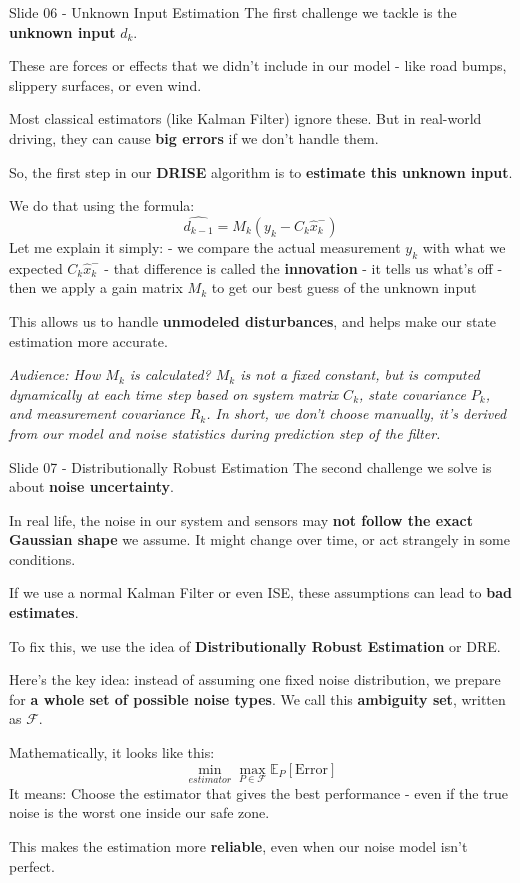 \documentclass{beamer}
\begin{document}
\begin{frame}{Slide 06 - Unknown Input Estimation}
\protect\hypertarget{slide-06---unknown-input-estimation}{}
The first challenge we tackle is the \textbf{unknown input} \(d_k\).

These are forces or effects that we didn't include in our model - like
road bumps, slippery surfaces, or even wind.

Most classical estimators (like Kalman Filter) ignore these. But in
real-world driving, they can cause \textbf{big errors} if we don't
handle them.

So, the first step in our \textbf{DRISE} algorithm is to
\textbf{estimate this unknown input}.

We do that using the formula:
\[\hat{d_{k-1}} = M_k (y_k - C_k \hat{x}_k^-)\] Let me explain it
simply: - we compare the actual measurement \(y_k\) with what we
expected \(C_k \hat{x}_k^-\) - that difference is called the
\textbf{innovation} - it tells us what's off - then we apply a gain
matrix \(M_k\) to get our best guess of the unknown input

This allows us to handle \textbf{unmodeled disturbances}, and helps make
our state estimation more accurate.

\emph{Audience: How \(M_k\) is calculated? \(M_k\) is not a fixed
constant, but is computed dynamically at each time step based on system
matrix \(C_k\), state covariance \(P_k\), and measurement covariance
\(R_k\). In short, we don't choose manually, it's derived from our model
and noise statistics during prediction step of the filter.}
\end{frame}

\begin{frame}{Slide 07 - Distributionally Robust Estimation}
\protect\hypertarget{slide-07---distributionally-robust-estimation}{}
The second challenge we solve is about \textbf{noise uncertainty}.

In real life, the noise in our system and sensors may \textbf{not follow
the exact Gaussian shape} we assume. It might change over time, or act
strangely in some conditions.

If we use a normal Kalman Filter or even ISE, these assumptions can lead
to \textbf{bad estimates}.

To fix this, we use the idea of \textbf{Distributionally Robust
Estimation} or DRE.

Here's the key idea: instead of assuming one fixed noise distribution,
we prepare for \textbf{a whole set of possible noise types}. We call
this \textbf{ambiguity set}, written as \(\mathcal{F}\).

Mathematically, it looks like this:
\[\min_{estimator} \max_{P \in \mathcal{F}} \mathbb{E}_P[\text{Error}]\]
It means: Choose the estimator that gives the best performance - even if
the true noise is the worst one inside our safe zone.

This makes the estimation more \textbf{reliable}, even when our noise
model isn't perfect.
\end{frame}
\end{document}
